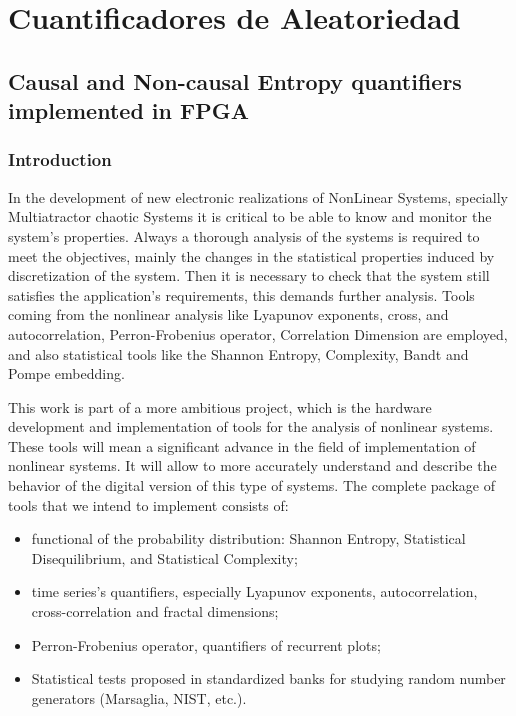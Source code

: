 \chapter{Cuantificadores de Aleatoriedad}




\section{Causal and Non-causal Entropy quantifiers implemented in FPGA}

\subsection{Introduction}
\label{sec:Intro}
In the development of new electronic realizations of NonLinear Systems, specially Multiatractor chaotic Systems it is critical to be able to know and monitor the system's properties. Always a thorough analysis of the systems is required to meet the objectives, mainly the changes in the statistical properties induced by discretization of the system. Then it is necessary to check that the system still satisfies the application's requirements, this demands further analysis. Tools coming from the nonlinear analysis like Lyapunov exponents, cross, and autocorrelation, Perron-Frobenius operator, Correlation Dimension are employed, and also statistical tools like the Shannon Entropy, Complexity, Bandt and Pompe
embedding.

This work is part of a more ambitious project, which is the hardware development and implementation of tools for the analysis of nonlinear systems. These tools will mean a significant advance in the field of implementation of nonlinear systems. It will allow to more accurately understand and describe the behavior of the digital version of this type of systems. The complete package of tools that we intend to implement consists of:
\begin{itemize}
\item functional of the probability distribution: Shannon Entropy, Statistical Disequilibrium, and Statistical Complexity;
\item time series's quantifiers, especially Lyapunov exponents, autocorrelation, cross-correlation and fractal dimensions;
\item Perron-Frobenius operator, quantifiers of recurrent plots;
\item Statistical tests proposed in standardized banks for studying random number generators (Marsaglia, NIST, etc.).
\end{itemize}

